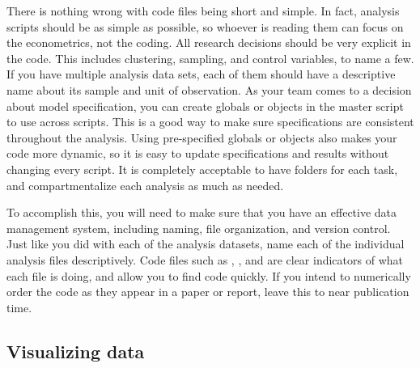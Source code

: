 There is nothing wrong with code files being short and simple.
In fact, analysis scripts should be as simple as possible, 
so whoever is reading them can focus on the econometrics, not the coding.
All research decisions should be very explicit in the code.
This includes clustering, sampling, and control variables, to name a few. 
If you have multiple analysis data sets, 
each of them should have a descriptive name about its sample and unit of observation.
As your team comes to a decision about model specification, 
you can create globals or objects in the master script to use across scripts.
This is a good way to make sure specifications are consistent throughout the analysis. 
Using pre-specified globals or objects also makes your code more dynamic,
so it is easy to update specifications and results without changing every script.
It is completely acceptable to have folders for each task, 
and compartmentalize each analysis as much as needed.

To accomplish this, you will need to make sure that you have an effective data management system, 
including naming, file organization, and version control.
Just like you did with each of the analysis datasets, 
name each of the individual analysis files descriptively.
Code files such as , 
, and  
are clear indicators of what each file is doing, and allow you to find code quickly.
If you intend to numerically order the code as they appear in a paper or report, 
leave this to near publication time.

\subsection{Visualizing data}

